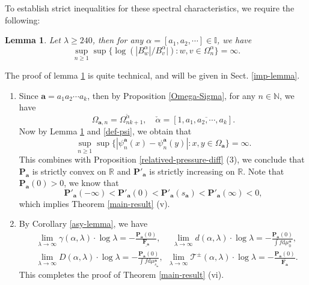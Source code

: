 \documentclass[reqno,11pt,graphicx,]{amsart}
\numberwithin{equation}{section}
\theoremstyle{plain}
\newcommand{\N}{{\mathbb N}}
\newcommand{\R}{{\mathbb R}}
\newcommand{\p}{\mathbf P}
\newcommand{\3}{\mathbf{3}}
\newcommand{\ma}{\mathbf{a}}
\newtheorem{lemma}[theorem]{Lemma}
\begin{document}
	To establish strict inequalities for these spectral characteristics, we require the following:
	\begin{lemma}\label{band-band}
		Let $\lambda\geq240$, then for any $\alpha=[a_1,a_2,\cdots]\in\mathbb{I}$, we have 
		\begin{equation*}
			\sup_{n\geq1}\sup\{\log(|B^{\alpha}_{w}|/B^{\alpha}_{v}|):w,v\in\Omega^{\alpha}_{n}\}=\infty.
		\end{equation*}
	\end{lemma}
	The proof of lemma \ref{band-band} is quite technical, and will be given in Sect. \ref{imp-lemma}.
	\begin{enumerate}[label=(\roman*),start=5]
		\item Since $\ma=a_1a_2\cdots a_k$, then by Proposition \ref{Omega-Sigma}, for any $n\in\N$, we have $$\Omega_{\ma,n}=\Omega^{\check{\alpha}}_{nk+1},\quad\check{\alpha}=[1,\overline{a_1,a_2,\cdots,a_k}].$$ Now by Lemma \ref{band-band} and \eqref{def-psi}, we obtain that 
		\begin{equation*}
			\sup_{n\geq1}\sup\{|\psi^{\ma}_{n}(x)-\psi^{\ma}_{n}(y)|:x,y\in\Omega_{\ma}\}=\infty.
		\end{equation*}
		This combines with Proposition \ref{relatived-pressure-diff} (3), we conclude that $\p_{\ma}$ is strictly convex on $\R$ and $\p'_{\ma}$ is strictly increasing on $\R$. Note that $\p_{\ma}(0)>0$, we know that
		\begin{equation*}
			\p'_{\ma}(-\infty)<\p'_{\ma}(0)<\p'_{\ma}(s_{\ma})<\p'_{\ma}(\infty)<0,
		\end{equation*}
		which implies Theorem \ref{main-result} (v).
		
		\item 	By Corollary \ref{asy-lemma}, we have
		\begin{align*}
			&\lim_{\lambda\to\infty}\gamma(\alpha,\lambda)\cdot\log\lambda=-\frac{\p_{\ma}(0)}{\underline{\mathbf{F}_{\ma}}},\ \ \ \ \ \ \lim_{\lambda\to\infty}d(\alpha,\lambda)\cdot\log\lambda=-\frac{\p_{\ma}(0)}{\int f\mathrm{d}\mu^{\ma}_0},\\
			&\lim_{\lambda\to\infty}D(\alpha,\lambda)\cdot\log\lambda=-\frac{\p_{\ma}(0)}{\int f\mathrm{d}\mu^{\ma}_{s_{\ma}}}, \ \   \lim_{\lambda\to\infty}\mathcal{T}^{\pm}(\alpha,\lambda)\cdot\log\lambda=-\frac{\p_{\ma}(0)}{\overline{\mathbf{F}_{\ma}}}.
		\end{align*}
		This completes the proof of Theorem \ref{main-result} (vi).
	\end{enumerate}
	
\end{document}
